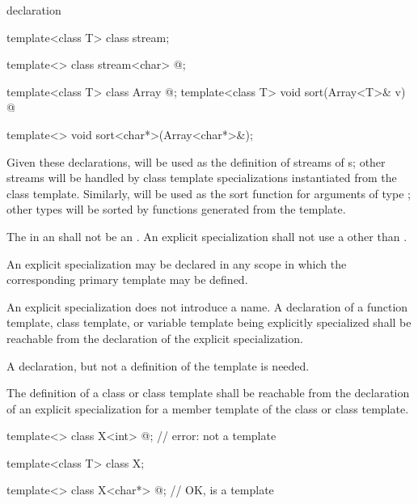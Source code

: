 \begin{bnf}
\br
   \terminal{<} \terminal{>} declaration
\end{bnf}

\begin{example}
\begin{codeblock}
template<class T> class stream;

template<> class stream<char> { @\commentellip@ };

template<class T> class Array { @\commentellip@ };
template<class T> void sort(Array<T>& v) { @\commentellip@ }

template<> void sort<char*>(Array<char*>&);
\end{codeblock}

Given these declarations,
will be used as the definition of streams of
s;
other streams will be handled by class template specializations instantiated
from the class template.
Similarly,
will be used as the sort function for arguments
of type
;
other
types will be sorted by functions generated from the template.
\end{example}

\pnum
The  in an 
shall not be an .
An explicit specialization shall not use
a 
other than .

\pnum
An explicit specialization
may be declared in any scope in which the corresponding primary template
may be defined.

\pnum
An explicit specialization does not introduce a name.
A declaration of a function template, class template, or variable template being explicitly
specialized shall be reachable from the declaration of
the explicit
specialization.
\begin{note}
A declaration, but not a definition of the template is needed.
\end{note}
The definition of a class or class template shall be reachable from the
declaration of an explicit specialization for a member template of the class
or class template.
\begin{example}
\begin{codeblock}
template<> class X<int> { @\commentellip@ };          // error:  not a template

template<class T> class X;

template<> class X<char*> { @\commentellip@ };        // OK,  is a template
\end{codeblock}
\end{example}

